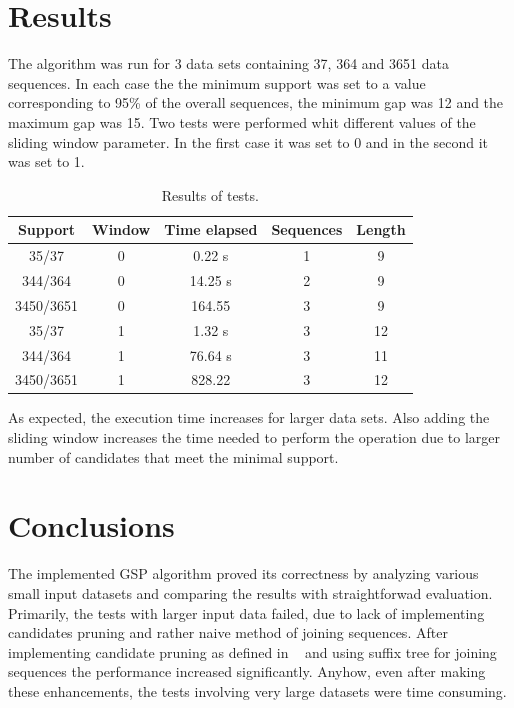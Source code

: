 \documentclass[journal,a4paper]{IEEEtran}
\begin{document}
\section{Results}
The algorithm was run for 3 data sets containing 37, 364 and 3651 data sequences. In each case the the minimum support was set to a value corresponding to 95\% of the overall sequences, the minimum gap was 12 and the maximum gap was 15. Two tests were performed whit different values of the sliding window parameter. In the first case it was set to 0 and in the second it was set to 1.

\begin{table}[!htbp]
\begin{center}
\begin{tabular}{|c|c|c|c|c|}
\hline
\textbf{Support} & \textbf{Window} & \textbf{Time elapsed} & \textbf{Sequences} & \textbf{Length} \\ 
\hline
35/37 & 0 & 0.22 s & 1 & 9 \\
\hline
344/364 & 0 & 14.25 s & 2 & 9 \\
\hline
3450/3651&0 & 164.55 & 3 & 9 \\
\hline
35/37 & 1 & 1.32 s & 3 & 12 \\
\hline
344/364 & 1 & 76.64 s & 3 & 11 \\
\hline
3450/3651 & 1 & 828.22 & 3 & 12 \\
\hline
\end{tabular}
\end{center}
\caption{Results of tests.}  
\label{tab:Res}
\end{table}

As expected, the execution time increases for larger data sets. Also adding the sliding window increases the time needed to perform the operation due to larger number of candidates that meet the minimal support.


\section{Conclusions}

The implemented GSP algorithm proved its correctness by analyzing various small input datasets and comparing the results with straightforwad evaluation. Primarily, the tests with larger input data failed, due to lack of implementing candidates pruning and rather naive method of joining sequences. After implementing candidate pruning as defined in ~\cite{gsp} and using suffix tree for joining sequences the performance increased significantly. Anyhow, even after making these enhancements, the tests involving very large datasets were time consuming. 
\end{document}
